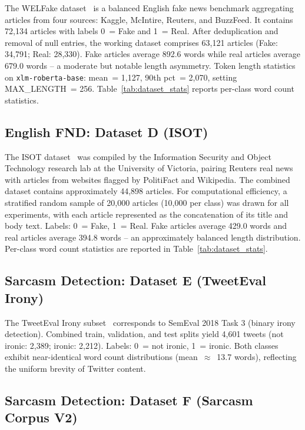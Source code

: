 \documentclass[conference]{IEEEtran}
\begin{document}
The WELFake dataset~\cite{verma2021welfake} is a balanced English
fake news benchmark aggregating articles from four sources: Kaggle,
McIntire, Reuters, and BuzzFeed. It contains 72,134 articles with
labels 0~= Fake and 1~= Real. After deduplication and removal of null
entries, the working dataset comprises 63,121 articles
(Fake: 34,791; Real: 28,330). Fake articles average 892.6 words
while real articles average 679.0 words -- a moderate but notable
length asymmetry. Token length statistics on
\texttt{xlm-roberta-base}: mean~= 1,127, 90th pct~= 2,070,
setting MAX\_LENGTH~= 256. Table~\ref{tab:dataset_stats} reports
per-class word count statistics.

\subsection{English FND: Dataset D (ISOT)}

The ISOT dataset~\cite{ahmed2018isot} was compiled by the
Information Security and Object Technology research lab at the
University of Victoria, pairing Reuters real news with articles from
websites flagged by PolitiFact and Wikipedia. The combined dataset
contains approximately 44,898 articles. For computational efficiency,
a stratified random sample of 20,000 articles (10,000 per class) was
drawn for all experiments, with each article represented as the
concatenation of its title and body text. Labels: 0~= Fake, 1~= Real.
Fake articles average 429.0 words and real articles average 394.8
words -- an approximately balanced length distribution.
Per-class word count statistics are reported in
Table~\ref{tab:dataset_stats}.

\subsection{Sarcasm Detection: Dataset E (TweetEval Irony)}

The TweetEval Irony subset~\cite{barbieri2020tweeteval,vanhee2018semeval}
corresponds to SemEval 2018 Task 3 (binary irony detection). Combined
train, validation, and test splits yield 4,601 tweets
(not ironic: 2,389; ironic: 2,212). Labels: 0~= not ironic,
1~= ironic. Both classes exhibit near-identical word count
distributions (mean~$\approx$~13.7 words), reflecting the uniform
brevity of Twitter content.

\subsection{Sarcasm Detection: Dataset F (Sarcasm Corpus V2)}
\end{document}
